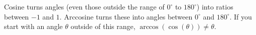 \documentclass[noauthor,nooutcomes,12pt,handout,hints]{ximera}
\begin{document}
\begin{question}
\begin{freeResponse}
\begin{enumerate}
\begin{center}
      \end{center}
      Cosine turns angles (even those outside the range of $0^\circ$
      to $180^\circ$) into ratios between $-1$ and $1$. Arccosine
      turns these into angles between $0^\circ$ and $180^\circ$. If
      you start with an angle $\theta$ outside of this range, $\arccos(\cos(\theta)) \neq \theta$.
      
    \end{enumerate}
  \end{freeResponse}
\end{question}
\end{document}
